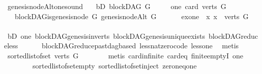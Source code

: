 \begin{isabellebody}
\isanewline
{}\isamarkupfalse%
\ genesis{\isacharunderscore}{\kern0pt}nodeAlt{\isacharunderscore}{\kern0pt}one{\isacharunderscore}{\kern0pt}sound{\isacharcolon}{\kern0pt}\isanewline
\ \ \ bD{\isacharcolon}{\kern0pt}\ {\isachardoublequoteopen}blockDAG\ G{\isachardoublequoteclose}\isanewline
\ \ \ \ \ one{\isacharcolon}{\kern0pt}\ {\isachardoublequoteopen}card\ {\isacharparenleft}{\kern0pt}verts\ G{\isacharparenright}{\kern0pt}\ {\isacharequal}{\kern0pt}\ {}{\isachardoublequoteclose}\isanewline
\ \ \ {\isachardoublequoteopen}blockDAG{\isachardot}{\kern0pt}is{\isacharunderscore}{\kern0pt}genesis{\isacharunderscore}{\kern0pt}node\ G\ {\isacharparenleft}{\kern0pt}genesis{\isacharunderscore}{\kern0pt}nodeAlt\ G{\isacharparenright}{\kern0pt}{\isachardoublequoteclose}\ \isanewline
%
\isadelimproof
%
\endisadelimproof
%
\isatagproof
{}\isamarkupfalse%
\ {\isacharminus}{\kern0pt}\isanewline
\ \ \isamarkupfalse%
\ exone{\isacharcolon}{\kern0pt}\ {\isachardoublequoteopen}{\isasymexists}{\isacharbang}{\kern0pt}\ x{\isachardot}{\kern0pt}\ x\ {\isasymin}\ {\isacharparenleft}{\kern0pt}verts\ G{\isacharparenright}{\kern0pt}{\isachardoublequoteclose}\isanewline
\ \ \ \ \isamarkupfalse%
\ bD\ one\ blockDAG{\isachardot}{\kern0pt}genesis{\isacharunderscore}{\kern0pt}in{\isacharunderscore}{\kern0pt}verts\ blockDAG{\isachardot}{\kern0pt}genesis{\isacharunderscore}{\kern0pt}unique{\isacharunderscore}{\kern0pt}exists\ blockDAG{\isachardot}{\kern0pt}reduce{\isacharunderscore}{\kern0pt}less\isanewline
\ \ \ \ \ \ blockDAG{\isachardot}{\kern0pt}reduce{\isacharunderscore}{\kern0pt}past{\isacharunderscore}{\kern0pt}dagbased\ less{\isacharunderscore}{\kern0pt}nat{\isacharunderscore}{\kern0pt}zero{\isacharunderscore}{\kern0pt}code\ less{\isacharunderscore}{\kern0pt}one\ \isamarkupfalse%
\ metis\ \isanewline
\ \ \isamarkupfalse%
\ \isamarkupfalse%
\ {\isachardoublequoteopen}sorted{\isacharunderscore}{\kern0pt}list{\isacharunderscore}{\kern0pt}of{\isacharunderscore}{\kern0pt}set\ {\isacharparenleft}{\kern0pt}verts\ G{\isacharparenright}{\kern0pt}\ {\isasymnoteq}\ {\isacharbrackleft}{\kern0pt}{\isacharbrackright}{\kern0pt}{\isachardoublequoteclose}\isanewline
\ \ \ \ \isamarkupfalse%
\ {\isacharparenleft}{\kern0pt}metis\ card{\isachardot}{\kern0pt}infinite\ card{\isacharunderscore}{\kern0pt}{}{\isacharunderscore}{\kern0pt}eq\ finite{\isachardot}{\kern0pt}emptyI\ one\ \isanewline
\ \ \ \ \ \ \ \ sorted{\isacharunderscore}{\kern0pt}list{\isacharunderscore}{\kern0pt}of{\isacharunderscore}{\kern0pt}set{\isacharunderscore}{\kern0pt}empty\ sorted{\isacharunderscore}{\kern0pt}list{\isacharunderscore}{\kern0pt}of{\isacharunderscore}{\kern0pt}set{\isacharunderscore}{\kern0pt}inject\ zero{\isacharunderscore}{\kern0pt}neq{\isacharunderscore}{\kern0pt}one{\isacharparenright}{\kern0pt}\ \isanewline

\end{isabellebody}
